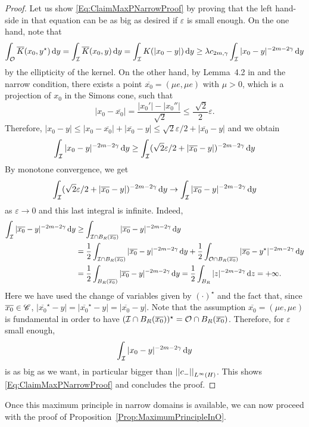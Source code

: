 \begin{proof}
	Let us show \eqref{Eq:ClaimMaxPNarrowProof} by proving that the left hand-side in that equation can be as big as desired if $\varepsilon$ is small enough. On the one hand, note that
	$$
	\int_{\mathcal{O}} \overline{K}(x_0,y^\star)\,\mathrm{d} y = \int_{\mathcal{I}} \overline{K}(x_0,y)\,\mathrm{d} y = \int_{\mathcal{I}} K(|x_0-y|)\,\mathrm{d} y \geq \lambda c_{2m,\gamma}\int_{\mathcal{I}} |x_0-y|^{-2m-2\gamma}\,\mathrm{d} y 
	$$
	by the ellipticity of the kernel. On the other hand, by Lemma~4.2 in \cite{CabreTerraI} and the narrow condition, there exists a point $\overline{x_0}=(\mu e, \mu e)$ with $\mu>0$, which is a projection of $x_0$ in the Simons cone, such that
    $$ |x_0-\overline{x_0}| = \frac{|x_0'|-|x_0''|}{\sqrt[]{2}} \leq \frac{\sqrt[]{2}}{2} \varepsilon. $$
	Therefore, $	|x_0 - y| \leq |x_0 - \overline{x_0}| + |\overline{x_0} - y| \leq \sqrt{2}\varepsilon/2 + |\overline{x_0} - y|$ and we obtain
	$$
	\int_{\mathcal{I}} |x_0-y|^{-2m-2\gamma}\,\mathrm{d} y  \geq
	\int_{\mathcal{I}} (\sqrt{2}\varepsilon/2 + |\overline{x_0} - y| )^{-2m-2\gamma}\,\mathrm{d} y
	$$
	By monotone convergence, we get
	$$
	\int_{\mathcal{I}} (\sqrt{2}\varepsilon/2 + |\overline{x_0} - y| )^{-2m-2\gamma}\,\mathrm{d} y \to \int_{\mathcal{I}} |\overline{x_0} - y|^{-2m-2\gamma} \,\mathrm{d} y 
	$$
	as $\varepsilon \to 0$ and this last integral is infinite. Indeed,
    \begin{align*}
    \int_{\mathcal{I}} |\overline{x_0} - y|^{-2m-2\gamma} \,\mathrm{d} y &\geq \int_{\mathcal{I}\cap B_R(\overline{x_0})} |\overline{x_0} - y|^{-2m-2\gamma}\,\mathrm{d} y \\
    &= \frac{1}{2}\int_{\mathcal{I}\cap B_R(\overline{x_0})}  |\overline{x_0} - y|^{-2m-2\gamma} \,\mathrm{d} y + \frac{1}{2}\int_{\mathcal{O}\cap B_R(\overline{x_0})} |\overline{x_0} - y^\star|^{-2m-2\gamma}\,\mathrm{d} y\\
    &= \frac{1}{2}\int_{B_R(\overline{x_0})} |\overline{x_0} - y|^{-2m-2\gamma} \,\mathrm{d} y = \frac{1}{2}\int_{B_R} |z|^{-2m-2\gamma} \,\mathrm{d} z = +\infty.
    \end{align*}
    Here we have used the change of variables given by $(\cdot)^\star$ and the fact that, since $\overline{x_0} \in \mathscr{C}$, $|\overline{x_0}^\star - y|= |\overline{x_0}^\star - y|= |\overline{x_0} - y|$. Note that the assumption $\overline{x_0} = (\mu e, \mu e)$ is fundamental in order to have $(\mathcal{I}\cap B_R(\overline{x_0}))^\star = \mathcal{O}\cap B_R(\overline{x_0})$. Therefore, for $\varepsilon$ small enough,
	$$
	\int_{\mathcal{I}} |x_0-y|^{-2m-2\gamma}\,\mathrm{d} y 
	$$
	is as big as we want, in particular bigger than $\left | \left |{c_-} \right | \right |_{L^\infty(H)}$. This shows \eqref{Eq:ClaimMaxPNarrowProof} and concludes the proof.
\end{proof}

Once this maximum principle in narrow domains is available, we can now proceed with the proof of Proposition~\ref{Prop:MaximumPrincipleInO}.


